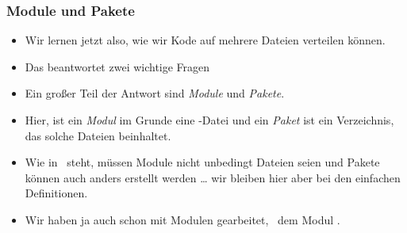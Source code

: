 \documentclass[aspectratio=169,mathserif,notheorems]{beamer}%
\begin{document}
\begin{frame}%
\frametitle{Module und Pakete}%
\begin{itemize}%
%
\item Wir lernen jetzt also, wie wir Kode auf mehrere Dateien verteilen können.%
%
\item<2-> Das beantwortet zwei wichtige Fragen%
%
\item<5-> Ein großer Teil der Antwort sind \emph{Module} und \emph{Pakete}\cite{PSF:P3D:TPLR:TIS}.%
%
\item<6-> Hier, ist ein \emph{Modul} im Grunde eine \python-Datei und ein \emph{Paket} ist ein Verzeichnis, das solche Dateien beinhaltet.%
%
\item<7-> Wie in~ steht, müssen Module nicht unbedingt Dateien seien und Pakete können auch anders erstellt werden {\dots} wir bleiben hier aber bei den einfachen Definitionen.%
%
\item<8-> Wir haben ja auch schon mit Modulen gearbeitet, \DEzB\ dem Modul .%
%
\end{itemize}%
\end{frame}%
%
\end{document}
